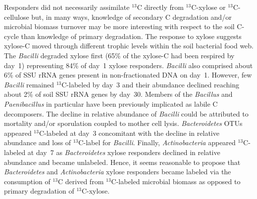 Responders did not necessarily assimilate $^{13}$C directly
from $^{13}$C-xylose or $^{13}$C-cellulose but, in many ways, knowledge of
secondary C degradation and/or microbial biomass turnover may be more
interesting with respect to the soil C-cycle than knowledge of primary
degradation. The response to xylose suggests xylose-C moved through different
trophic levels within the soil bacterial food web. The \textit{Bacilli}
degraded xylose first (65\% of the xylose-C had been respired by day~1)
representing 84\% of day~1 xylose responders. \textit{Bacilli} also comprised
about 6\% of SSU rRNA genes present in non-fractionated DNA on day~1. However,
few \textit{Bacilli} remained $^{13}$C-labeled by day~3 and their abundance
declined reaching about 2\% of soil SSU rRNA genes by day~30. Members of the
\textit{Bacillus} \citep{Cleveland2007} and \textit{Paenibacillus} in
particular \citep{Verastegui_2014} have been previously implicated as labile
C decomposers. The decline in relative abundance of \textit{Bacilli} could be
attributed to mortality and/or sporulation coupled to mother cell lysis.
\textit{Bacteroidetes} OTUs appeared $^{13}$C-labeled at day~3 concomitant with
the decline in relative abundance and loss of $^{13}$C-label for
\textit{Bacilli}. Finally, \textit{Actinobacteria} appeared $^{13}$C-labeled at
day~7 as \textit{Bacteroidetes} xylose responders declined in relative
abundance and became unlabeled. Hence, it seems reasonable to propose that
\textit{Bacteroidetes} and \textit{Actinobacteria} xylose responders became
labeled via the consumption of $^{13}$C derived from $^{13}$C-labeled microbial
biomass as opposed to primary degradation of $^{13}$C-xylose. 

